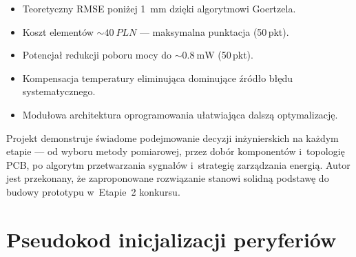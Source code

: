 \documentclass[a4paper,11pt]{article}
\begin{document}
	\begin{itemize}[nosep]
		\item Teoretyczny RMSE poniżej \SI{1}{\milli\metre} dzięki algorytmowi Goertzela.
		\item Koszt elementów ${\sim}\SI{40}{PLN}$ --- maksymalna punktacja (50\,pkt).
		\item Potencjał redukcji poboru mocy do ${\sim}\SI{0,8}{\milli\watt}$ (50\,pkt).
		\item Kompensacja temperatury eliminująca dominujące źródło błędu systematycznego.
		\item Modułowa architektura oprogramowania ułatwiająca dalszą optymalizację.
	\end{itemize}
	
	Projekt demonstruje świadome podejmowanie decyzji inżynierskich na każdym
	etapie --- od wyboru metody pomiarowej, przez dobór komponentów i~topologię
	PCB, po algorytm przetwarzania sygnałów i~strategię zarządzania energią.
	Autor jest przekonany, że zaproponowane rozwiązanie stanowi solidną podstawę
	do budowy prototypu w~Etapie~2 konkursu.
	
	
	\appendix
	\section{Pseudokod inicjalizacji peryferiów}
	\label{app:init}
	
\end{document}
